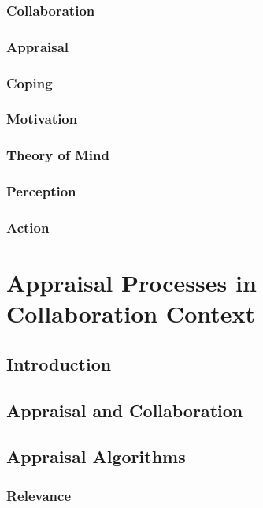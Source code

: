 \documentclass[12pt]{report}
\begin{document}
\subsection{Collaboration}

\subsection{Appraisal}

\subsection{Coping}

\subsection{Motivation}

\subsection{Theory of Mind}

\subsection{Perception}

\subsection{Action}

\chapter{Appraisal Processes in Collaboration Context}
\label{ch:appraisals}

\section{Introduction}

\section{Appraisal and Collaboration}

\section{Appraisal Algorithms}

\subsection{Relevance}
\end{document}
